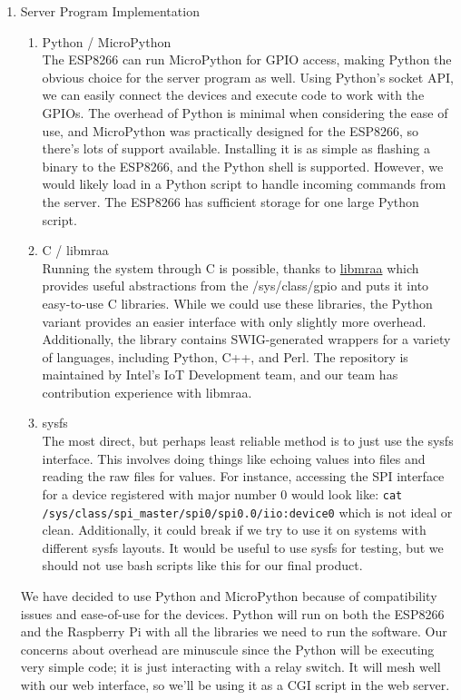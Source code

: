\documentclass[12pt]{article}
\begin{document}
\begin{enumerate}
    \item Server Program Implementation
        \begin{enumerate}
            \item Python / MicroPython \\
            The ESP8266 can run MicroPython for GPIO access, making Python the obvious choice for the server program as well. Using Python's socket API, we can easily connect the devices and execute code to work with the GPIOs. The overhead of Python is minimal when considering the ease of use, and MicroPython was practically designed for the ESP8266, so there's lots of support available. Installing it is as simple as flashing a binary to the ESP8266, and the Python shell is supported. However, we would likely load in a Python script to handle incoming commands from the server. The ESP8266 has sufficient storage for one large Python script.
            \item C / libmraa \\
            Running the system through C is possible, thanks to \href{https://github.com/intel-iot-devkit/mraa}{libmraa} which provides useful abstractions from the /sys/class/gpio and puts it into easy-to-use C libraries. While we could use these libraries, the Python variant provides an easier interface with only slightly more overhead. Additionally, the library contains SWIG-generated wrappers for a variety of languages, including Python, C++, and Perl. The repository is maintained by Intel's IoT Development team, and our team has contribution experience with libmraa. 
            \item sysfs \\
            The most direct, but perhaps least reliable method is to just use the sysfs interface. This involves doing things like echoing values into files and reading the raw files for values. For instance, accessing the SPI interface for a device registered with major number 0 would look like: \verb|cat /sys/class/spi_master/spi0/spi0.0/iio:device0| which is not ideal or clean. Additionally, it could break if we try to use it on systems with different sysfs layouts. It would be useful to use sysfs for testing, but we should not use bash scripts like this for our final product. 
        \end{enumerate}
        We have decided to use Python and MicroPython because of compatibility issues and ease-of-use for the devices. Python will run on both the ESP8266 and the Raspberry Pi with all the libraries we need to run the software. Our concerns about overhead are minuscule since the Python will be executing very simple code; it is just interacting with a relay switch. It will mesh well with our web interface, so we'll be using it as a CGI script in the web server.

\end{enumerate}
\end{document}
